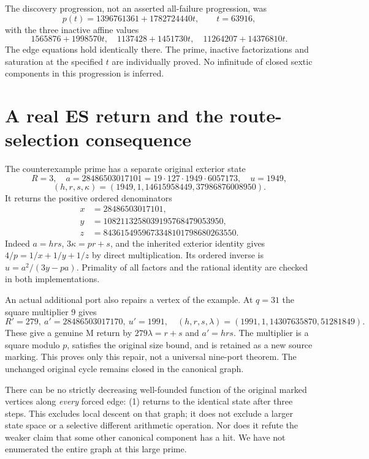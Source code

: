 The discovery progression, not an asserted all-failure progression, was
\[
 p(t)=1396761361+1782724440t,\qquad t=63916,
\]
with the three inactive affine values
\[
 1565876+1998570t,\quad1137428+1451730t,\quad11264207+14376810t.
\]
The edge equations hold identically there. The prime, inactive factorizations
and saturation at the specified $t$ are individually proved. No infinitude of
closed sextic components in this progression is inferred.

\section{A real ES return and the route-selection consequence}\label{sec:positive}
The counterexample prime has a separate original exterior state
\[
 R=3,\quad a=28486503017101=19\cdot127\cdot1949\cdot6057173,
 \quad u=1949,
\]
\[
 (h,r,s,\kappa)=(1949,1,14615958449,37986876008950).
\]
It returns the positive ordered denominators
\[
 \begin{split}
 x&=28486503017101,\\
 y&=1082113258039195768479053950,\\
 z&=8436154959673348101798680263550.
 \end{split}                                               \tag{25}
\]
Indeed $a=hrs$, $3\kappa=pr+s$, and the inherited exterior identity
\cite[\S2, Proposition 2.2]{ET} gives $4/p=1/x+1/y+1/z$ by direct multiplication.
Its ordered inverse is $u=a^2/(3y-pa)$. Primality of all factors and the rational
identity are checked in both implementations.

An actual additional port also repairs a vertex of the example. At $q=31$ the
square multiplier 9 gives
\[
 R'=279,\ a'=28486503017170,\ u'=1991,\quad
 (h,r,s,\lambda)=(1991,1,14307635870,51281849).             \tag{26}
\]
These give a genuine M return by $279\lambda=r+s$ and $a'=hrs$.
The multiplier is a square modulo $p$, satisfies the original size bound, and is
retained as a new source marking. This proves only this repair, not a universal
nine-port theorem. The unchanged original cycle remains closed in the canonical
graph.

There can be no strictly decreasing well-founded function of the original
marked vertices along \emph{every} forced edge: (1) returns to the identical
state after three steps. This excludes local descent on that graph; it does not
exclude a larger state space or a selective different arithmetic operation.
Nor does it refute the weaker claim that some other canonical component has a
hit. We have not enumerated the entire graph at this large prime.

